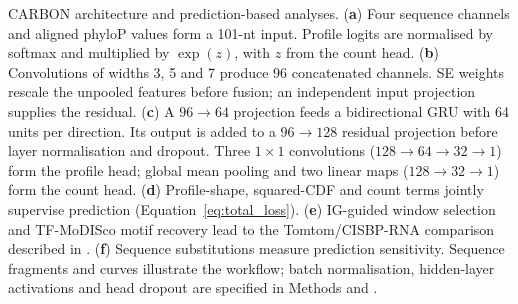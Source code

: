 \caption{CARBON architecture and prediction-based analyses. (\textbf{a}) Four sequence channels and aligned phyloP values form a 101-nt input. Profile logits are normalised by softmax and multiplied by $\exp(z)$, with $z$ from the count head. (\textbf{b}) Convolutions of widths 3, 5 and 7 produce 96 concatenated channels. SE weights rescale the unpooled features before fusion; an independent input projection supplies the residual. (\textbf{c}) A $96\rightarrow64$ projection feeds a bidirectional GRU with 64 units per direction. Its output is added to a $96\rightarrow128$ residual projection before layer normalisation and dropout. Three $1\times1$ convolutions ($128\rightarrow64\rightarrow32\rightarrow1$) form the profile head; global mean pooling and two linear maps ($128\rightarrow32\rightarrow1$) form the count head. (\textbf{d}) Profile-shape, squared-CDF and count terms jointly supervise prediction (Equation~\ref{eq:total_loss}). (\textbf{e}) IG-guided window selection and TF-MoDISco motif recovery lead to the Tomtom/CISBP-RNA comparison described in . (\textbf{f}) Sequence substitutions measure prediction sensitivity. Sequence fragments and curves illustrate the workflow; batch normalisation, hidden-layer activations and head dropout are specified in Methods and .}
